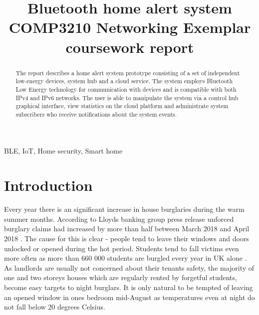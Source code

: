 \documentclass[conference]{IEEEtran}
\begin{document}
\title{Bluetooth home alert system\\
{\footnotesize COMP3210 Networking Exemplar coursework report}
}

\author{
}

\maketitle

\begin{abstract}
The report describes a home alert system prototype consisting of a set of independent low-energy devices, system hub and a cloud service. The system employs Bluetooth Low Energy technology for communication with devices and is compatible with both IPv4 and IPv6 networks. The user is able to manipulate the system via a control hub graphical interface, view statistics on the cloud platform and administrate system subscribers who receive notifications about the system events.
\end{abstract}

\begin{IEEEkeywords}
BLE, IoT, Home security, Smart home
\end{IEEEkeywords}


\section{Introduction}
Every year there is an significant increase in house burglaries during the warm summer months. According to Lloyds banking group press release unforced burglary claims had increased by more than half between March 2018 and April 2018 \cite{halifax}. The cause for this is clear - people tend to leave their windows and doors unlocked or opened during the hot period. Students tend to fall victims even more often as more than 660 000 students are burgled every year in UK alone \cite{express}. As landlords are usually not concerned about their tenants safety, the majority of one and two storeys houses which are regularly rented by forgetful students, become easy targets to night burglars. It is only natural to be tempted of leaving an opened window in ones bedroom mid-August as temperatures even at night do not fall below 20 degrees Celsius. 
\end{document}
